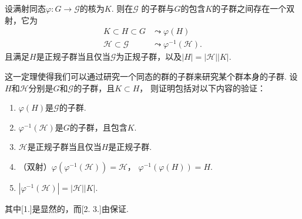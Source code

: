   \begin{thm}
    设满射同态$\varphi:G\to\mathcal{G}$的核为$K$. 则在$\mathcal{G}$
    的子群与$G$的包含$K$的子群之间存在一个双射，它为
    \[\begin{split}
      K\subset H\subset G &\leadsto \varphi(H) \\
      \mathcal{H} \subset \mathcal{G} &\leadsto \varphi^{-1}(\mathcal{H}).
    \end{split}\]
    且满足$H$是正规子群当且仅当$\mathcal{G}$为正规子群，以及$|H|=|\mathcal{H}||K|$.
  \end{thm}
  \remark
    这一定理使得我们可以通过研究一个同态的群的子群来研究某个群本身的子群.
  \proof
    设$H$和$\mathcal{H}$分别是$G$和$\mathcal{G}$的子群，且$K\subset H$，
    则证明包括对以下内容的验证：
    \begin{enumerate}
      \item $\varphi(H)$是$\mathcal{G}$的子群.
      \item $\varphi^{-1}(\mathcal{H})$是$G$的子群，且包含$K$.
      \item $\mathcal{H}$是正规子群当且仅当$H$是正规子群.
      \item （双射）$\varphi(\varphi^{-1}(\mathcal{H}))=\mathcal{H}$，
        $\varphi^{-1}(\varphi(H))=H$.
      \item $|\varphi^{-1}(\mathcal{H})|=|\mathcal{H}||K|$.
    \end{enumerate}
    其中[1.]是显然的，而[2. 3.]由保证.



